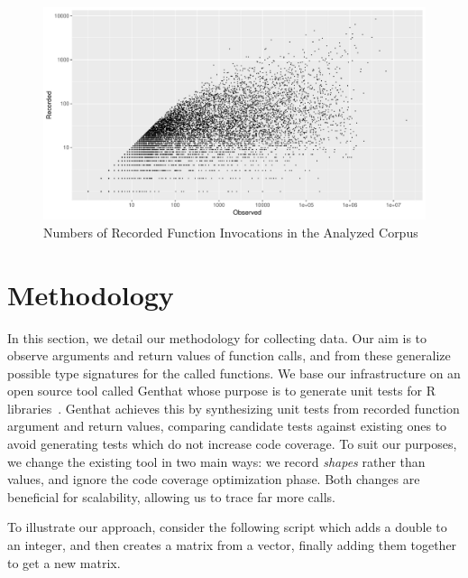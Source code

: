 \documentclass[acmsmall,10pt,review,anonymous]{acmart}\settopmatter{printfolios=true,printccs=false,printacmref=false}
\newcommand{\genthat}{{\sc Genthat}\xspace}
\begin{document}
\begin{figure}[htbp]\begin{center}
\includegraphics[width=.9\textwidth]{recordsbypkg}
\caption{Numbers of Recorded Function Invocations in the Analyzed Corpus}
\label{recorded}\end{center}
\end{figure}

\newpage
\section{Methodology}

In this section, we detail our methodology for collecting data.  Our aim is
to observe arguments and return values of function calls, and from these
generalize possible type signatures for the called functions.  We base our
infrastructure on an open source tool called \genthat whose purpose is to
generate unit tests for R libraries~\cite{issta18}.  \genthat achieves this
by synthesizing unit tests from recorded function argument and return
values, comparing candidate tests against existing ones to avoid generating tests
which do not increase code coverage.  To suit our purposes, we change the
existing tool in two main ways: we record \emph{shapes} rather than values,
and ignore the code coverage optimization phase.  Both changes are
beneficial for scalability, allowing us to trace far more calls.


To illustrate our approach, consider the following script which adds a
double to an integer, and then creates a matrix from a vector, finally
adding them together to get a new matrix.
\end{document}
